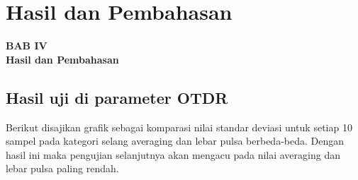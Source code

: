 \documentclass[12pt]{article}
\begin{document}
	\setcounter{figure}{0}
	
	\section{Hasil dan Pembahasan}
	
	\begin{center}
		{\large \textbf{BAB IV}} \\
		{\large \textbf{Hasil dan Pembahasan}}
	\end{center}
	
	\subsection{Hasil uji di parameter OTDR}
	
	Berikut disajikan grafik sebagai komparasi nilai standar deviasi untuk setiap 10 sampel pada kategori selang averaging dan lebar pulsa berbeda-beda.
	Dengan hasil ini maka pengujian selanjutnya akan mengacu pada nilai averaging dan lebar pulsa paling rendah.
	
\end{document}
